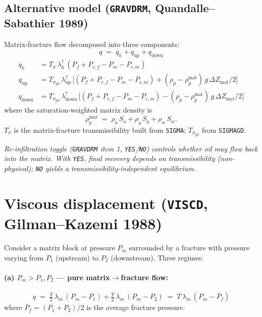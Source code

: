 \documentclass[11pt,a4paper]{article}
\newcommand{\kw}[1]{\texttt{#1}}
\newcommand{\note}[1]{\par\smallskip\textit{#1}\par\smallskip}
\begin{document}
\subsection*{Alternative model (\kw{GRAVDRM}, Quandalle--Sabathier 1989)}
Matrix-fracture flow decomposed into three components:
\begin{equation}
q \;=\; q_h + q_{\text{up}} + q_{\text{down}}
\label{eq:q-qsab}
\tag{TD 2.68}
\end{equation}
\begin{align}
q_h &= T_{\sigma}\,\lambda^{\uparrow}_h\,(P_f + P_{c,f} - P_m - P_{c,m})
\label{eq:qh}\tag{TD 2.69}\\
q_{\text{up}} &= T_{\sigma_{\text{gd}}}\,\lambda^{\uparrow}_{\text{up}}\,
   \bigl[(P_f + P_{c,f} - P_m - P_{c,m}) + (\rho_p - \rho^{\text{mat}}_p)\,g\,\Delta Z_{\text{mat}}/2\bigr]
\label{eq:qup}\tag{TD 2.70}\\
q_{\text{down}} &= T_{\sigma_{\text{gd}}}\,\lambda^{\uparrow}_{\text{down}}\,
   \bigl[(P_f + P_{c,f} - P_m - P_{c,m}) - (\rho_p - \rho^{\text{mat}}_p)\,g\,\Delta Z_{\text{mat}}/2\bigr]
\label{eq:qdown}\tag{TD 2.71}
\end{align}
where the saturation-weighted matrix density is
\[
\rho^{\text{mat}}_p \;=\; \rho_o\,S_o + \rho_g\,S_g + \rho_w\,S_w .
\]
$T_\sigma$ is the matrix-fracture transmissibility built from \kw{SIGMA}; $T_{\sigma_{\text{gd}}}$ from \kw{SIGMAGD}.
\note{Re-infiltration toggle (\kw{GRAVDRM} item 1, \texttt{YES}/\texttt{NO}) controls whether oil may flow back into the matrix.
With \texttt{YES}, final recovery depends on transmissibility (non-physical); \texttt{NO} yields a transmissibility-independent equilibrium.}

\section{Viscous displacement (\kw{VISCD}, Gilman--Kazemi 1988)}
Consider a matrix block at pressure $P_m$ surrounded by a fracture with pressure varying from $P_1$ (upstream) to $P_2$ (downstream). Three regimes:

\paragraph{(a) $P_m > P_1, P_2$ — pure matrix$\to$fracture flow:}
\begin{equation}
q \;=\; \tfrac{T}{2}\,\lambda_m\,(P_m - P_1) + \tfrac{T}{2}\,\lambda_m\,(P_m - P_2) \;=\; T\,\lambda_m\,(P_m - \bar P_f)
\label{eq:visc-a}
\tag{TD 2.72--2.73}
\end{equation}
where $\bar P_f = (P_1+P_2)/2$ is the average fracture pressure.
\end{document}
